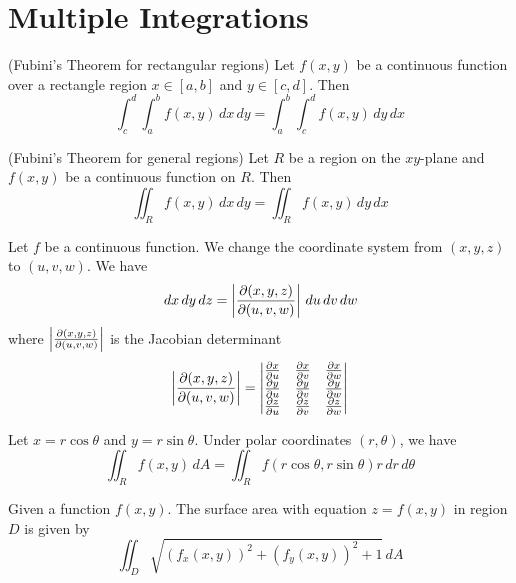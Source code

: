 \documentclass{huhtakm-template-book}
\begin{document}
\chapter{Multiple Integrations}
\begin{thm}(Fubini's Theorem for rectangular regions)
    Let $f(x,y)$ be a continuous function over a rectangle region $x\in[a,b]$ and $y\in[c,d]$. Then
    \begin{equation*}
        \int_{c}^{d}\int_{a}^{b}f(x,y)\,dx\,dy=\int_{a}^{b}\int_{c}^{d}f(x,y)\,dy\,dx
    \end{equation*}
\end{thm}
\begin{thm}(Fubini's Theorem for general regions)
    Let $R$ be a region on the $xy$-plane and $f(x,y)$ be a continuous function on $R$. Then
    \begin{equation*}
        \iint_{R}f(x,y)\,dx\,dy=\iint_{R}f(x,y)\,dy\,dx
    \end{equation*}
\end{thm}
\begin{thm}
    Let $f$ be a continuous function. We change the coordinate system from $(x,y,z)$ to $(u,v,w)$. We have
    \begin{equation*}
        \,dx\,dy\,dz=\left|{\frac{\partial(x,y,z)}{\partial(u,v,w)}}\right|\,du\,dv\,dw
    \end{equation*}
    where $\left|{\frac{\partial(x,y,z)}{\partial(u,v,w)}}\right|$ is the Jacobian determinant
    \begin{equation*}
        \left|{\frac{\partial(x,y,z)}{\partial(u,v,w)}}\right|=\begin{vmatrix}
            \pdv{x}{u} & \pdv{x}{v} & \pdv{x}{w}\\
            \pdv{y}{u} & \pdv{y}{v} & \pdv{y}{w}\\
            \pdv{z}{u} & \pdv{z}{v} & \pdv{z}{w}
        \end{vmatrix}
    \end{equation*}
\end{thm}
\begin{thm}
    Let $x=r\cos\theta$ and $y=r\sin\theta$. Under polar coordinates $(r,\theta)$, we have
    \begin{equation*}
        \iint_{R}f(x,y)\,dA=\iint_{R}f(r\cos\theta,r\sin\theta)r\,dr\,d\theta
    \end{equation*}
\end{thm}
\begin{thm}
    Given a function $f(x,y)$. The surface area with equation $z=f(x,y)$ in region $D$ is given by
    \begin{equation*}
        \iint_{D}\sqrt{(f_{x}(x,y))^{2}+(f_{y}(x,y))^{2}+1}\,dA
    \end{equation*}
\end{thm}
\end{document}
